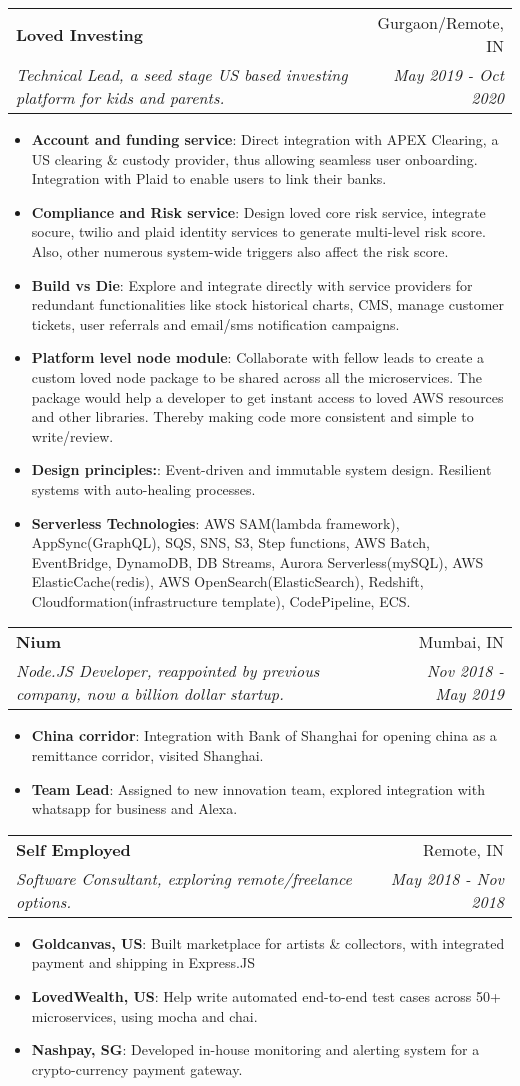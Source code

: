 \documentclass[letterpaper,11pt]{article}
\makeatletter
\newcommand{\resumeItem}[2]{
  \item\small{
    \textbf{#1}{: #2 \vspace{-2pt}}
  }
}
\newcommand{\resumeSubheading}[4]{
  \vspace{-1pt}\item
    \begin{tabular*}{0.97\textwidth}{l@{\extracolsep{\fill}}r}
      \textbf{#1} & #2 \\
      \textit{\small#3} & \textit{\small #4} \\
    \end{tabular*}\vspace{-5pt}
}
\newcommand{\resumeItemListStart}{\begin{itemize}}
\newcommand{\resumeItemListEnd}{\end{itemize}\vspace{-5pt}}
\makeatother
\begin{document}
    \resumeSubheading
      {Loved Investing}{Gurgaon/Remote, IN}
      {Technical Lead, a seed stage US based investing platform for kids and parents.}{May 2019 - Oct 2020}
      \resumeItemListStart
        \resumeItem{Account and funding service}
          {Direct integration with APEX Clearing, a US clearing \& custody provider, thus allowing seamless user onboarding. Integration with Plaid to enable users to link their banks.}
        \resumeItem{Compliance and Risk service}
          {Design loved core risk service, integrate socure, twilio and plaid identity services to generate multi-level risk score. Also, other numerous system-wide triggers also affect the risk score.}
        \resumeItem{Build vs Die}
          {Explore and integrate directly with service providers for redundant functionalities like stock historical charts, CMS, manage customer tickets, user referrals and email/sms notification campaigns.}
        \resumeItem{Platform level node module}
          {Collaborate with fellow leads to create a custom loved node package to be shared across all the microservices. The package would help a developer to get instant access to loved AWS resources and other libraries. Thereby making code more consistent and simple to write/review.}
        \resumeItem{Design principles:}
          {Event-driven and immutable system design. Resilient systems with auto-healing processes.}
        \resumeItem{Serverless Technologies}
          {AWS SAM(lambda framework), AppSync(GraphQL), SQS, SNS, S3, Step functions, AWS Batch, EventBridge, DynamoDB, DB Streams, Aurora Serverless(mySQL), AWS ElasticCache(redis), AWS OpenSearch(ElasticSearch), Redshift, Cloudformation(infrastructure template), CodePipeline, ECS.}
      \resumeItemListEnd
      
    \resumeSubheading
      {Nium}{Mumbai, IN}
      {Node.JS Developer, reappointed by previous company, now a billion dollar startup.}{Nov 2018 - May 2019}
      \resumeItemListStart
        \resumeItem{China corridor}
          {Integration with Bank of Shanghai for opening china as a remittance corridor, visited Shanghai.}
        \resumeItem{Team Lead}
          {Assigned to new innovation team, explored integration with whatsapp for business and Alexa.}
      \resumeItemListEnd

    \resumeSubheading
      {Self Employed}{Remote, IN}
      {Software Consultant, exploring remote/freelance options.}{May 2018 - Nov 2018}
      \resumeItemListStart
        \resumeItem{Goldcanvas, US}
          {Built marketplace for artists \& collectors, with integrated payment and shipping in Express.JS}
        \resumeItem{LovedWealth, US}
          {Help write automated end-to-end test cases across 50+ microservices, using mocha and chai.}
        \resumeItem{Nashpay, SG}
          {Developed in-house monitoring and alerting system for a crypto-currency payment gateway.}
      \resumeItemListEnd
\end{document}
